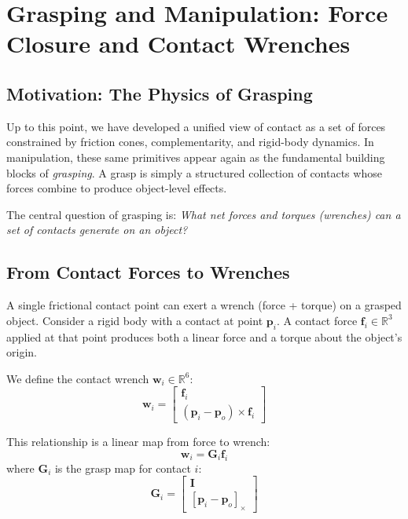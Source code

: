\documentclass[11pt,twoside]{report}
\theoremstyle{definition}
\theoremstyle{plain}
\theoremstyle{remark}
\newcommand{\R}{\mathbb{R}}
\newcommand{\0}{\bm{0}}
\newcommand{\I}{\bm{I}}
\begin{document}
\chapter{Grasping and Manipulation: Force Closure and Contact Wrenches}
\label{ch:grasping}

\section{Motivation: The Physics of Grasping}

Up to this point, we have developed a unified view of contact as a set of forces constrained by friction cones, complementarity, and rigid-body dynamics. In manipulation, these same primitives appear again as the fundamental building blocks of \emph{grasping}. A grasp is simply a structured collection of contacts whose forces combine to produce object-level effects.

The central question of grasping is: \emph{What net forces and torques (wrenches) can a set of contacts generate on an object?}

\section{From Contact Forces to Wrenches}

A single frictional contact point can exert a wrench (force + torque) on a grasped object. Consider a rigid body with a contact at point $\bm{p}_{i}$. A contact force $\bm{f}_{i} \in \R^{3}$ applied at that point produces both a linear force and a torque about the object's origin.

We define the contact wrench $\bm{w}_{i} \in \R^{6}$:
\begin{equation}
\bm{w}_{i} =
\begin{bmatrix}
\bm{f}_{i} \\
(\bm{p}_{i} - \bm{p}_{o}) \times \bm{f}_{i}
\end{bmatrix}
\end{equation}

This relationship is a linear map from force to wrench:
\begin{equation}
\bm{w}_{i} = \bm{G}_{i} \bm{f}_{i}
\end{equation}
where $\bm{G}_{i}$ is the grasp map for contact $i$:
\begin{equation}
\bm{G}_{i} =
\begin{bmatrix}
\I \\
[\bm{p}_{i} - \bm{p}_{o}]_{\times}
\end{bmatrix}
\end{equation}
\end{document}
